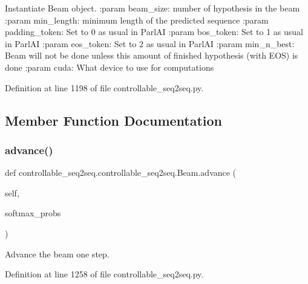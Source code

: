 \begin{DoxyVerb}Instantiate Beam object.
:param beam_size:
    number of hypothesis in the beam
:param min_length:
    minimum length of the predicted sequence
:param padding_token:
    Set to 0 as usual in ParlAI
:param bos_token:
    Set to 1 as usual in ParlAI
:param eos_token:
    Set to 2 as usual in ParlAI
:param min_n_best:
    Beam will not be done unless this amount of finished hypothesis
    (with EOS) is done
:param cuda:
    What device to use for computations
\end{DoxyVerb}
 

Definition at line 1198 of file controllable\+\_\+seq2seq.\+py.



\subsection{Member Function Documentation}
\mbox{\label{classcontrollable__seq2seq_1_1controllable__seq2seq_1_1Beam_aaabdc74d8e5ffec4cd92b7fd350aaaf4}} 
\subsubsection{\texorpdfstring{advance()}{advance()}}
{\footnotesize\ttfamily def controllable\+\_\+seq2seq.\+controllable\+\_\+seq2seq.\+Beam.\+advance (\begin{DoxyParamCaption}\item[{}]{self,  }\item[{}]{softmax\+\_\+probs }\end{DoxyParamCaption})}

\begin{DoxyVerb}Advance the beam one step.\end{DoxyVerb}
 

Definition at line 1258 of file controllable\+\_\+seq2seq.\+py.



